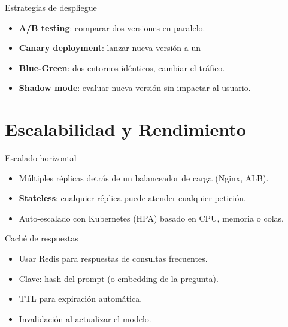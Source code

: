 \documentclass[aspectratio=169, 10pt, xcolor=table]{beamer}
\begin{document}
\begin{frame}{Estrategias de despliegue}
    \begin{itemize}
        \item \textbf{A/B testing}: comparar dos versiones en paralelo.
        \item \textbf{Canary deployment}: lanzar nueva versión a un %
        \item \textbf{Blue-Green}: dos entornos idénticos, cambiar el tráfico.
        \item \textbf{Shadow mode}: evaluar nueva versión sin impactar al usuario.
    \end{itemize}
\end{frame}

\section{Escalabilidad y Rendimiento}

\begin{frame}{Escalado horizontal}
    \begin{itemize}
        \item Múltiples réplicas detrás de un balanceador de carga (Nginx, ALB).
        \item \textbf{Stateless}: cualquier réplica puede atender cualquier petición.
        \item Auto-escalado con Kubernetes (HPA) basado en CPU, memoria o colas.
    \end{itemize}
\end{frame}

\begin{frame}{Caché de respuestas}
    \begin{itemize}
        \item Usar Redis para respuestas de consultas frecuentes.
        \item Clave: hash del prompt (o embedding de la pregunta).
        \item TTL para expiración automática.
        \item Invalidación al actualizar el modelo.
    \end{itemize}
\end{frame}
\end{document}
